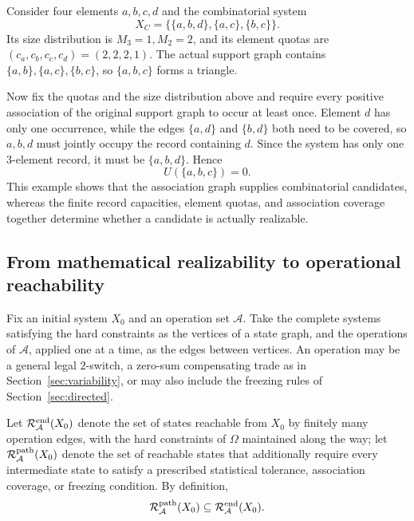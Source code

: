 \documentclass[11pt,a4paper]{article}
\numberwithin{equation}{section}
\theoremstyle{definition}
\numberwithin{algorithm}{section}
\begin{document}
Consider four elements $a,b,c,d$ and the combinatorial system
\begin{equation}
X_C=\bigl\{\{a,b,d\},\{a,c\},\{b,c\}\bigr\}.
\label{eq:resource-counterexample}
\end{equation}
Its size distribution is $M_3=1,M_2=2$, and its element quotas are
$(c_a,c_b,c_c,c_d)=(2,2,2,1)$.
The actual support graph contains $\{a,b\},\{a,c\},\{b,c\}$, so $\{a,b,c\}$ forms a triangle.

Now fix the quotas and the size distribution above and require every positive association of
the original support graph to occur at least once.
Element $d$ has only one occurrence, while the edges $\{a,d\}$ and $\{b,d\}$ both need to be
covered, so $a,b,d$ must jointly occupy the record containing $d$.
Since the system has only one $3$-element record, it must be $\{a,b,d\}$.
Hence
\begin{equation}
U(\{a,b,c\})=0.
\label{eq:resource-exclusion}
\end{equation}
This example shows that the association graph supplies combinatorial candidates, whereas the
finite record capacities, element quotas, and association coverage together determine whether
a candidate is actually realizable.

\subsection{From mathematical realizability to operational reachability}\label{subsec:boundary-reachability}

Fix an initial system $X_0$ and an operation set $\mathcal A$.
Take the complete systems satisfying the hard constraints as the vertices of a state graph,
and the operations of $\mathcal A$, applied one at a time, as the edges between vertices.
An operation may be a general legal $2$-switch, a zero-sum compensating trade as in
Section~\ref{sec:variability}, or may also include the freezing rules of
Section~\ref{sec:directed}.

Let $\mathcal R_{\mathcal A}^{\rm end}(X_0)$ denote the set of states reachable from $X_0$
by finitely many operation edges, with the hard constraints of $\Omega$ maintained along the
way; let $\mathcal R_{\mathcal A}^{\rm path}(X_0)$ denote the set of reachable states that
additionally require every intermediate state to satisfy a prescribed statistical tolerance,
association coverage, or freezing condition.
By definition,
\begin{equation}
\mathcal R_{\mathcal A}^{\rm path}(X_0)
\subseteq\mathcal R_{\mathcal A}^{\rm end}(X_0).
\label{eq:path-inclusion}
\end{equation}
\end{document}

